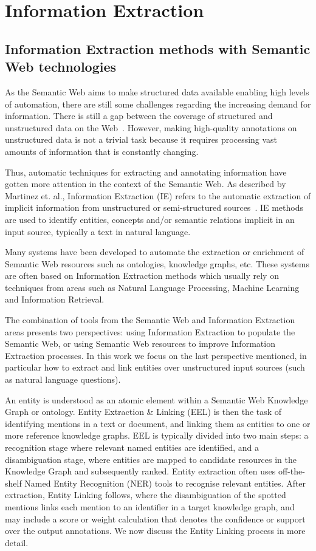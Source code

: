 \section{Information Extraction}
\label{cap2:theoFrame/infExtr}
\subsection{Information Extraction methods with Semantic Web technologies}
\label{cap2:theoFrame/infExtr/methods}
As the Semantic Web aims to make structured data available enabling high levels of 
automation, there are still some challenges regarding the increasing demand for information. 
There is still a gap between the coverage of structured and unstructured data on the 
Web~\cite{infExtr:PolleresHHD10}. However, making high-quality annotations on unstructured 
data is not a trivial task because it requires processing vast amounts of information that 
is constantly changing. 

Thus, automatic techniques for extracting and annotating information have gotten more 
attention in the context of the Semantic Web. As described by Martinez et. al., Information 
Extraction (IE) refers to the automatic extraction of implicit information from unstructured 
or semi-structured sources~\cite{infExtr:MartinezHL19}. IE methods are used to identify 
entities, concepts and/or semantic relations implicit in an input source, typically a text 
in natural language. 

Many systems have been developed to automate the extraction or enrichment of Semantic Web 
resources such as ontologies, knowledge graphs, etc. These systems are often based on 
Information Extraction methods which usually rely on techniques from areas such as Natural 
Language Processing, Machine Learning and Information Retrieval. 

The combination of tools from the Semantic Web and Information Extraction areas presents two 
perspectives: using Information Extraction to populate the Semantic Web, or using Semantic 
Web resources to improve Information Extraction processes. In this work we focus on the last 
perspective mentioned, in particular how to extract and link entities over unstructured input 
sources (such as natural language questions).

An entity is understood as an atomic element within a Semantic Web Knowledge Graph or ontology. 
Entity Extraction \& Linking (EEL) is then the task of identifying mentions in a text or 
document, and linking them as entities to one or more reference knowledge graphs. EEL is 
typically divided into two main steps: a recognition stage where relevant named entities are 
identified, and a disambiguation stage, where entities are mapped to candidate resources in 
the Knowledge Graph and subsequently ranked. Entity extraction often uses off-the-shelf Named 
Entity Recognition (NER) tools to recognise relevant entities. After extraction, Entity 
Linking follows, where the disambiguation of the spotted mentions links each mention to an 
identifier in a target knowledge graph, and may include a score or weight calculation that 
denotes the confidence or support over the output annotations. We now discuss the Entity 
Linking process in more detail.

